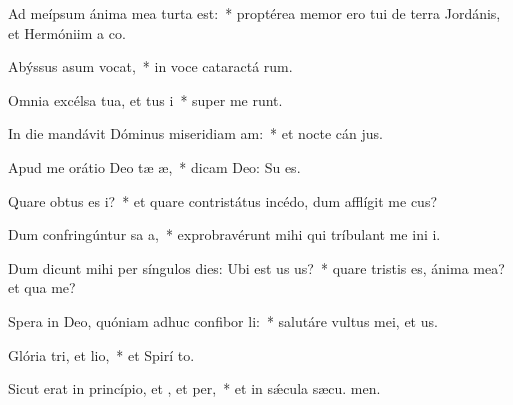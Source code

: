 \item Ad meípsum ánima mea turta est:~* proptérea memor ero tui de terra Jordánis, et Hermóniim a  co.
\item Abýssus asum vocat,~* in voce cataractá rum.
\item Omnia excélsa tua, et tus i~* super me runt.
\item In die mandávit Dóminus miseridiam am:~* et nocte cán jus.
\item Apud me orátio Deo tæ æ,~* dicam Deo: Su  es.
\item Quare obtus es i?~* et quare contristátus incédo, dum afflígit me cus?
\item Dum confringúntur sa a,~* exprobravérunt mihi qui tríbulant me ini i.
\item Dum dicunt mihi per síngulos dies: Ubi est us us?~* quare tristis es, ánima mea? et qua  me?
\item Spera in Deo, quóniam adhuc confibor li:~* salutáre vultus mei, et  us.
\item Glória tri, et lio,~* et Spirí to.
\item Sicut erat in princípio, et , et per,~* et in sǽcula sæcu. men.
